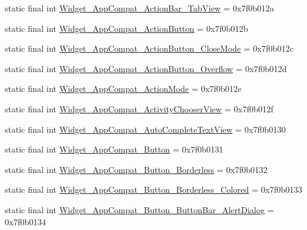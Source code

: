 \begin{CompactItemize}
static final int \hyperlink{classandroid_1_1support_1_1graphics_1_1drawable_1_1animated_1_1_r_1_1style_c44920177f9ea384e1551d1dc50249eb}{Widget\_\-AppCompat\_\-ActionBar\_\-TabView} = 0x7f0b012a
\item 
static final int \hyperlink{classandroid_1_1support_1_1graphics_1_1drawable_1_1animated_1_1_r_1_1style_6171985bdf7ea1e55e2e4631593a5b2f}{Widget\_\-AppCompat\_\-ActionButton} = 0x7f0b012b
\item 
static final int \hyperlink{classandroid_1_1support_1_1graphics_1_1drawable_1_1animated_1_1_r_1_1style_af622bb557d1c45507d0c46cc41f198a}{Widget\_\-AppCompat\_\-ActionButton\_\-CloseMode} = 0x7f0b012c
\item 
static final int \hyperlink{classandroid_1_1support_1_1graphics_1_1drawable_1_1animated_1_1_r_1_1style_77eb86e6764dcdceb8629190c8ab7878}{Widget\_\-AppCompat\_\-ActionButton\_\-Overflow} = 0x7f0b012d
\item 
static final int \hyperlink{classandroid_1_1support_1_1graphics_1_1drawable_1_1animated_1_1_r_1_1style_849d7f4901e1432b40d3d0da98531304}{Widget\_\-AppCompat\_\-ActionMode} = 0x7f0b012e
\item 
static final int \hyperlink{classandroid_1_1support_1_1graphics_1_1drawable_1_1animated_1_1_r_1_1style_d1ef7484aa10084bbc3c20b8ead621eb}{Widget\_\-AppCompat\_\-ActivityChooserView} = 0x7f0b012f
\item 
static final int \hyperlink{classandroid_1_1support_1_1graphics_1_1drawable_1_1animated_1_1_r_1_1style_1ac39a6368fad5b10b5556760698ee1a}{Widget\_\-AppCompat\_\-AutoCompleteTextView} = 0x7f0b0130
\item 
static final int \hyperlink{classandroid_1_1support_1_1graphics_1_1drawable_1_1animated_1_1_r_1_1style_12bb060f9cc9684ad453b3f8f3e8743d}{Widget\_\-AppCompat\_\-Button} = 0x7f0b0131
\item 
static final int \hyperlink{classandroid_1_1support_1_1graphics_1_1drawable_1_1animated_1_1_r_1_1style_4dfeb02e6cc6693eeff7cf3b67b63288}{Widget\_\-AppCompat\_\-Button\_\-Borderless} = 0x7f0b0132
\item 
static final int \hyperlink{classandroid_1_1support_1_1graphics_1_1drawable_1_1animated_1_1_r_1_1style_4b7f1a8bbea46b7174e86290543df27a}{Widget\_\-AppCompat\_\-Button\_\-Borderless\_\-Colored} = 0x7f0b0133
\item 
static final int \hyperlink{classandroid_1_1support_1_1graphics_1_1drawable_1_1animated_1_1_r_1_1style_b86272429b0566587a48b8c46638067a}{Widget\_\-AppCompat\_\-Button\_\-ButtonBar\_\-AlertDialog} = 0x7f0b0134

\end{CompactItemize}
